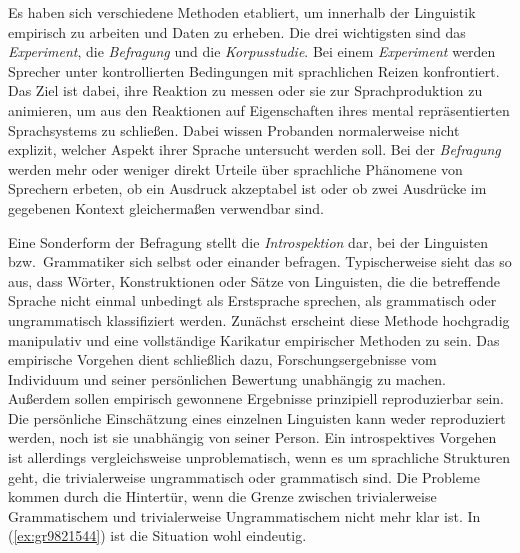 Es haben sich verschiedene Methoden etabliert, um innerhalb der Linguistik empirisch zu arbeiten und Daten zu erheben.
Die drei wichtigsten sind das \textit{Experiment}, die \textit{Befragung} und die \textit{Korpusstudie}.
Bei einem \textit{Experiment} werden Sprecher unter kontrollierten Bedingungen mit sprachlichen Reizen konfrontiert.
Das Ziel ist dabei, ihre Reaktion zu messen oder sie zur Sprachproduktion zu animieren, um aus den Reaktionen auf Eigenschaften ihres mental repräsentierten Sprachsystems zu schließen.
Dabei wissen Probanden normalerweise nicht explizit, welcher Aspekt ihrer Sprache untersucht werden soll.
Bei der \textit{Befragung} werden mehr oder weniger direkt Urteile über sprachliche Phänomene von Sprechern erbeten, \zB ob ein Ausdruck akzeptabel ist oder ob zwei Ausdrücke im gegebenen Kontext gleichermaßen verwendbar sind.

Eine Sonderform der Befragung stellt die \textit{Introspektion} dar, bei der Linguisten bzw.\ Grammatiker sich selbst oder einander befragen.
Typischerweise sieht das so aus, dass Wörter, Konstruktionen oder Sätze von Linguisten, die die betreffende Sprache nicht einmal unbedingt als Erstsprache sprechen, als grammatisch oder ungrammatisch klassifiziert werden.
Zunächst erscheint diese Methode hochgradig manipulativ und eine vollständige Karikatur empirischer Methoden zu sein.
Das empirische Vorgehen dient schließlich dazu, Forschungsergebnisse vom Individuum und seiner persönlichen Bewertung unabhängig zu machen.
Außerdem sollen empirisch gewonnene Ergebnisse prinzipiell reproduzierbar sein.
Die persönliche Einschätzung eines einzelnen Linguisten kann weder reproduziert werden, noch ist sie unabhängig von seiner Person.
Ein introspektives Vorgehen ist allerdings vergleichsweise unproblematisch, wenn es um sprachliche Strukturen geht, die trivialerweise ungrammatisch oder grammatisch sind.
Die Probleme kommen durch die Hintertür, wenn die Grenze zwischen trivialerweise Grammatischem und trivialerweise Ungrammatischem nicht mehr klar ist.
In (\ref{ex:gr9821544}) ist die Situation wohl eindeutig.

\begin{exe}
  \ex\label{ex:gr9821544}
  \begin{xlist}
  \end{xlist}
\end{exe}

